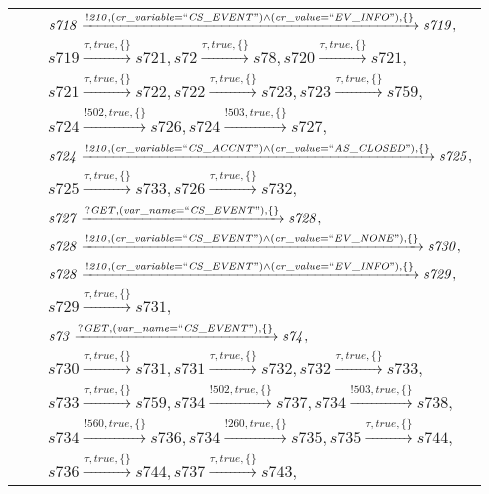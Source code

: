 \begin{tabular}{lcp{350px}}
& & $\mathit{s718}\xrightarrow{\mathit{!210}, \mathit{(cr\_variable = ``CS\_EVENT") \land (cr\_value = ``EV\_INFO")}, \{\}}\mathit{s719},$ \\
& & $\mathit{s719}\xrightarrow{\mathit{\tau}, \mathit{true}, \{\}}\mathit{s721},\mathit{s72}\xrightarrow{\mathit{\tau}, \mathit{true}, \{\}}\mathit{s78},\mathit{s720}\xrightarrow{\mathit{\tau}, \mathit{true}, \{\}}\mathit{s721},$ \\
& & $\mathit{s721}\xrightarrow{\mathit{\tau}, \mathit{true}, \{\}}\mathit{s722},\mathit{s722}\xrightarrow{\mathit{\tau}, \mathit{true}, \{\}}\mathit{s723},\mathit{s723}\xrightarrow{\mathit{\tau}, \mathit{true}, \{\}}\mathit{s759},$ \\
& & $\mathit{s724}\xrightarrow{\mathit{!502}, \mathit{true}, \{\}}\mathit{s726},\mathit{s724}\xrightarrow{\mathit{!503}, \mathit{true}, \{\}}\mathit{s727},$ \\
& & $\mathit{s724}\xrightarrow{\mathit{!210}, \mathit{(cr\_variable = ``CS\_ACCNT") \land (cr\_value = ``AS\_CLOSED")}, \{\}}\mathit{s725},$ \\
& & $\mathit{s725}\xrightarrow{\mathit{\tau}, \mathit{true}, \{\}}\mathit{s733},\mathit{s726}\xrightarrow{\mathit{\tau}, \mathit{true}, \{\}}\mathit{s732},$ \\
& & $\mathit{s727}\xrightarrow{\mathit{?GET}, \mathit{(var\_name = ``CS\_EVENT")}, \{\}}\mathit{s728},$ \\
& & $\mathit{s728}\xrightarrow{\mathit{!210}, \mathit{(cr\_variable = ``CS\_EVENT") \land (cr\_value = ``EV\_NONE")}, \{\}}\mathit{s730},$ \\
& & $\mathit{s728}\xrightarrow{\mathit{!210}, \mathit{(cr\_variable = ``CS\_EVENT") \land (cr\_value = ``EV\_INFO")}, \{\}}\mathit{s729},$ \\
& & $\mathit{s729}\xrightarrow{\mathit{\tau}, \mathit{true}, \{\}}\mathit{s731},$ \\
& & $\mathit{s73}\xrightarrow{\mathit{?GET}, \mathit{(var\_name = ``CS\_EVENT")}, \{\}}\mathit{s74},$ \\
& & $\mathit{s730}\xrightarrow{\mathit{\tau}, \mathit{true}, \{\}}\mathit{s731},\mathit{s731}\xrightarrow{\mathit{\tau}, \mathit{true}, \{\}}\mathit{s732},\mathit{s732}\xrightarrow{\mathit{\tau}, \mathit{true}, \{\}}\mathit{s733},$ \\
& & $\mathit{s733}\xrightarrow{\mathit{\tau}, \mathit{true}, \{\}}\mathit{s759},\mathit{s734}\xrightarrow{\mathit{!502}, \mathit{true}, \{\}}\mathit{s737},\mathit{s734}\xrightarrow{\mathit{!503}, \mathit{true}, \{\}}\mathit{s738},$ \\
& & $\mathit{s734}\xrightarrow{\mathit{!560}, \mathit{true}, \{\}}\mathit{s736},\mathit{s734}\xrightarrow{\mathit{!260}, \mathit{true}, \{\}}\mathit{s735},\mathit{s735}\xrightarrow{\mathit{\tau}, \mathit{true}, \{\}}\mathit{s744},$ \\
& & $\mathit{s736}\xrightarrow{\mathit{\tau}, \mathit{true}, \{\}}\mathit{s744},\mathit{s737}\xrightarrow{\mathit{\tau}, \mathit{true}, \{\}}\mathit{s743},$ \\
\end{tabular}


